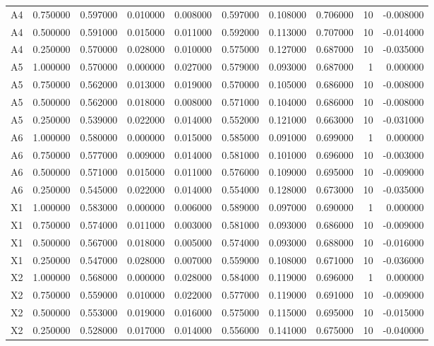 \begin{table}
\begin{tabular}{lrrrrrrrrr}
A4 & 0.750000 & 0.597000 & 0.010000 & 0.008000 & 0.597000 & 0.108000 & 0.706000 & 10 & -0.008000 \\
A4 & 0.500000 & 0.591000 & 0.015000 & 0.011000 & 0.592000 & 0.113000 & 0.707000 & 10 & -0.014000 \\
A4 & 0.250000 & 0.570000 & 0.028000 & 0.010000 & 0.575000 & 0.127000 & 0.687000 & 10 & -0.035000 \\
A5 & 1.000000 & 0.570000 & 0.000000 & 0.027000 & 0.579000 & 0.093000 & 0.687000 & 1 & 0.000000 \\
A5 & 0.750000 & 0.562000 & 0.013000 & 0.019000 & 0.570000 & 0.105000 & 0.686000 & 10 & -0.008000 \\
A5 & 0.500000 & 0.562000 & 0.018000 & 0.008000 & 0.571000 & 0.104000 & 0.686000 & 10 & -0.008000 \\
A5 & 0.250000 & 0.539000 & 0.022000 & 0.014000 & 0.552000 & 0.121000 & 0.663000 & 10 & -0.031000 \\
A6 & 1.000000 & 0.580000 & 0.000000 & 0.015000 & 0.585000 & 0.091000 & 0.699000 & 1 & 0.000000 \\
A6 & 0.750000 & 0.577000 & 0.009000 & 0.014000 & 0.581000 & 0.101000 & 0.696000 & 10 & -0.003000 \\
A6 & 0.500000 & 0.571000 & 0.015000 & 0.011000 & 0.576000 & 0.109000 & 0.695000 & 10 & -0.009000 \\
A6 & 0.250000 & 0.545000 & 0.022000 & 0.014000 & 0.554000 & 0.128000 & 0.673000 & 10 & -0.035000 \\
X1 & 1.000000 & 0.583000 & 0.000000 & 0.006000 & 0.589000 & 0.097000 & 0.690000 & 1 & 0.000000 \\
X1 & 0.750000 & 0.574000 & 0.011000 & 0.003000 & 0.581000 & 0.093000 & 0.686000 & 10 & -0.009000 \\
X1 & 0.500000 & 0.567000 & 0.018000 & 0.005000 & 0.574000 & 0.093000 & 0.688000 & 10 & -0.016000 \\
X1 & 0.250000 & 0.547000 & 0.028000 & 0.007000 & 0.559000 & 0.108000 & 0.671000 & 10 & -0.036000 \\
X2 & 1.000000 & 0.568000 & 0.000000 & 0.028000 & 0.584000 & 0.119000 & 0.696000 & 1 & 0.000000 \\
X2 & 0.750000 & 0.559000 & 0.010000 & 0.022000 & 0.577000 & 0.119000 & 0.691000 & 10 & -0.009000 \\
X2 & 0.500000 & 0.553000 & 0.019000 & 0.016000 & 0.575000 & 0.115000 & 0.695000 & 10 & -0.015000 \\
X2 & 0.250000 & 0.528000 & 0.017000 & 0.014000 & 0.556000 & 0.141000 & 0.675000 & 10 & -0.040000 \\

\end{tabular}
\end{table}

